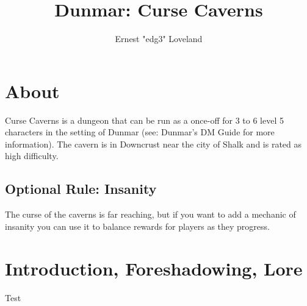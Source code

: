 \documentclass[10pt,twoside,twocolumn]{article}
\title{Dunmar: Curse Caverns}
\author{Ernest "edg3" Loveland}
\begin{document}
\selectfont %

\maketitle
\tableofcontents

\section{About}
Curse Caverns is a dungeon that can be run as a once-off for 3 to 6 level 5 characters in the setting of Dunmar (see: Dunmar's DM Guide for more information). The cavern is in Downcrust near the city of Shalk and is rated as high difficulty.

\subsection{Optional Rule: Insanity}
The curse of the caverns is far reaching, but if you want to add a mechanic of insanity you can use it to balance rewards for players as they progress.


\section{Introduction, Foreshadowing, Lore}

\begin{quotebox}
Test
\end{quotebox}
\end{document}
